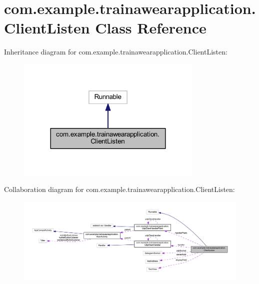 \hypertarget{classcom_1_1example_1_1trainawearapplication_1_1_client_listen}{}\section{com.\+example.\+trainawearapplication.\+Client\+Listen Class Reference}
\label{classcom_1_1example_1_1trainawearapplication_1_1_client_listen}


Inheritance diagram for com.\+example.\+trainawearapplication.\+Client\+Listen\+:
\nopagebreak
\begin{figure}[H]
\begin{center}
\leavevmode
\includegraphics[width=252pt]{classcom_1_1example_1_1trainawearapplication_1_1_client_listen__inherit__graph}
\end{center}
\end{figure}


Collaboration diagram for com.\+example.\+trainawearapplication.\+Client\+Listen\+:
\nopagebreak
\begin{figure}[H]
\begin{center}
\leavevmode
\includegraphics[width=350pt]{classcom_1_1example_1_1trainawearapplication_1_1_client_listen__coll__graph}
\end{center}
\end{figure}
